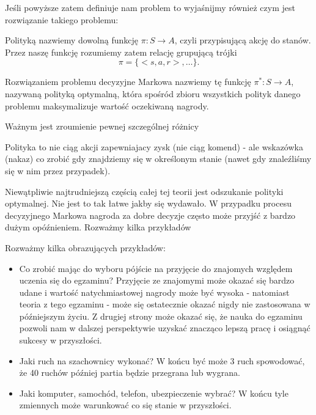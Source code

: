 \documentclass[10pt,a4paper]{book}
\begin{document}
Jeśli powyższe zatem definiuje nam problem to wyjaśnijmy również czym jest rozwiązanie takiego problemu:

\begin{definition}[Polityka]
Polityką nazwiemy dowolną funkcję $\pi: S \to A$, czyli przypisującą akcję do stanów. Przez naszę funkcję rozumiemy zatem relację grupującą trójki 
$$
\pi = \{ <s,a,r>, \ldots \}.
$$
\end{definition}

\begin{definition}
Rozwiązaniem problemu decyzyjne Markowa nazwiemy tę funkcję $\pi^\ast: S \to A$, nazywaną polityką optymalną, która spośród zbioru wszystkich polityk danego problemu maksymalizuje wartość oczekiwaną nagrody.
\end{definition}

Ważnym jest zroumienie pewnej szczególnej różnicy

\begin{remark*}
Polityka to nie ciąg akcji zapewniajacy zysk (nie ciąg komend) - ale wskazówka (nakaz) co zrobić gdy znajdziemy się w określonym stanie (nawet gdy znaleźliśmy się w nim przez przypadek).
\end{remark*}

Niewątpliwie najtrudniejszą częścią całej tej teorii jest odszukanie polityki optymalnej. Nie jest to tak łatwe jakby się wydawało. W przypadku procesu decyzyjnego Markowa nagroda za dobre decyzje często może przyjść z bardzo dużym opóźnieniem. Rozważmy kilka przykładów

\begin{example}[Przykłady]

Rozważmy kilka obrazujących przykładów:
\begin{itemize}
\item Co zrobić mając do wyboru pójście na przyjęcie do znajomych względem uczenia się do egzaminu? Przyjęcie ze znajomymi może okazać się bardzo udane i wartość natychmiastowej nagrody może być wysoka - natomiast teoria z tego egzaminu - może się ostatecznie okazać nigdy nie zastosowana w późniejszym życiu. Z drugiej strony może okazać się, że nauka do egzaminu pozwoli nam w dalszej perspektywie uzyskać znacząco lepszą pracę i osiągnąć sukcesy w przyszłości.
\item Jaki ruch na szachownicy wykonać? W końcu być może 3 ruch spowodować, że 40 ruchów później partia będzie przegrana lub wygrana.
\item Jaki komputer, samochód, telefon, ubezpieczenie wybrać? W końcu tyle zmiennych może warunkować co się stanie w przyszłości.
\end{itemize}

\end{example}
\end{document}
